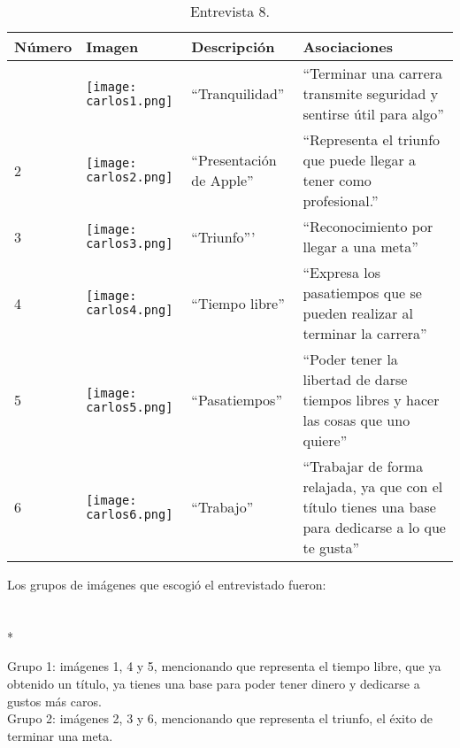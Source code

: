 \begin{table}[H]
\centering
\begin{tabular}{>{\centering\arraybackslash}m{1cm} >{\centering\arraybackslash}m{2cm} >{\arraybackslash}m{5cm}>{\arraybackslash}m{5cm}}
\hline
Número  & Imagen & Descripción & Asociaciones \\
\hline \hline

1 & \texttt{[image: carlos1.png]} & ``Tranquilidad'' & ``Terminar una carrera transmite seguridad y sentirse útil para algo'' \\
\hline

2 & \texttt{[image: carlos2.png]} & ``Presentación de Apple'' & ``Representa el triunfo que puede llegar a tener como profesional.'' \\
\hline

3 & \texttt{[image: carlos3.png]} & ``Triunfo''' & ``Reconocimiento por llegar a una meta'' \\
\hline

4 & \texttt{[image: carlos4.png]} & ``Tiempo libre'' & ``Expresa los pasatiempos que se pueden realizar al terminar la carrera'' \\
\hline

5 & \texttt{[image: carlos5.png]} & ``Pasatiempos'' & ``Poder tener la libertad de darse tiempos libres y hacer las cosas que uno quiere'' \\
\hline

6 & \texttt{[image: carlos6.png]} & ``Trabajo'' & ``Trabajar de forma relajada, ya que con el título tienes una base para dedicarse a lo que te gusta'' \\
\hline


\end{tabular}
\caption{Entrevista 8.}
\label{tabla:carlos}
\end{table}

Los grupos de imágenes que escogió el entrevistado fueron:\\
\\
\\*

Grupo 1: imágenes 1, 4 y 5, mencionando que representa el tiempo libre, que ya obtenido un título, ya tienes una base para poder tener dinero y dedicarse a gustos más caros. \\

Grupo 2: imágenes 2, 3 y 6, mencionando que representa el triunfo, el éxito de terminar una meta.\\


